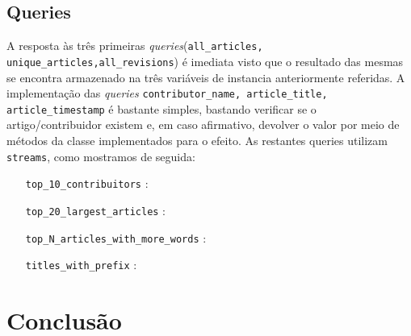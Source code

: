 \documentclass[a4paper,11pt]{article}
\begin{document}
\subsection{Queries}
A resposta às três primeiras \textit{queries}(\texttt{all\_articles, unique\_articles,all\_revisions}) é imediata visto que o resultado das mesmas se encontra armazenado na três variáveis de instancia anteriormente referidas. A implementação das \textit{queries} \texttt{contributor\_name, article\_title, article\_timestamp} é bastante simples, bastando verificar se o artigo/contribuidor existem e, em caso afirmativo, devolver o valor por meio de métodos da classe implementados para o efeito. As restantes queries utilizam \texttt{streams}, como mostramos de seguida:
\begin{itemize}[align=left]
\item[\texttt{top\_10\_contribuitors}] :
\item[\texttt{top\_20\_largest\_articles}] :
\item[\texttt{top\_N\_articles\_with\_more\_words}] :
\item[\texttt{titles\_with\_prefix}] :
\end{itemize}

\newpage

\section{Conclusão}
\end{document}
